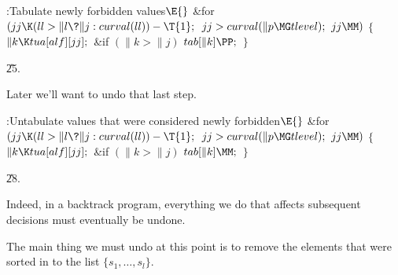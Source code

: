 \Y\B\4:Tabulate newly forbidden values\X${}\E{}$\6
\&{for} ${}(\\{jj}\K(\\{ll}>\|l\?\|j:\\{curval}(\\{ll}))-\T{1};{}$ ${}\\{jj}>%
\\{curval}(\|p\MG\\{tlevel});{}$ ${}\\{jj}\MM){}$\5
${}\{{}$\1\6
${}\|k\K\\{tua}[\\{alf}][\\{jj}];{}$\6
\&{if} ${}(\|k>\|j){}$\1\5
${}\\{tab}[\|k]\PP;{}$\2\6
\4${}\}{}$\2\par
\U25.\fi

Later we'll want to undo that last step.

\Y\B\4:Untabulate values that were considered newly forbidden\X${}\E{}$\6
\&{for} ${}(\\{jj}\K(\\{ll}>\|l\?\|j:\\{curval}(\\{ll}))-\T{1};{}$ ${}\\{jj}>%
\\{curval}(\|p\MG\\{tlevel});{}$ ${}\\{jj}\MM){}$\5
${}\{{}$\1\6
${}\|k\K\\{tua}[\\{alf}][\\{jj}];{}$\6
\&{if} ${}(\|k>\|j){}$\1\5
${}\\{tab}[\|k]\MM;{}$\2\6
\4${}\}{}$\2\par
\U28.\fi

Indeed, in a backtrack program, everything we do that affects subsequent
decisions must eventually be undone.

The main thing we must undo at this point is to remove the 
elements that were sorted in to the list $\{s_1,\ldots,s_l\}$.


